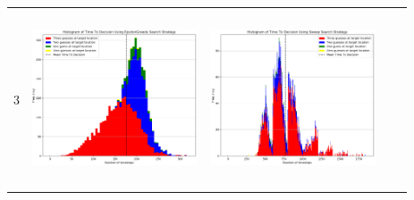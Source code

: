 \begin{landscape}
\begin{table}[h!]
\begin{tabular}{ | c | c | c | c | c |}
    3 & 
    \begin{minipage}[c][58mm][c]{49mm}
      \includegraphics[width=49mm, height=52mm]{Chapters/MultiAgentTargetDetection/Figs/Histograms/MultipleTarget/3/3EpsilonGreedyHistogram.png}
    \end{minipage}
    &
    \begin{minipage}[c][58mm][c]{49mm}
      \includegraphics[width=49mm, height=52mm]{Chapters/MultiAgentTargetDetection/Figs/Histograms/MultipleTarget/3/3SweepHistogram.png}


\end{minipage}
\end{tabular}
\end{table}
\end{landscape}
